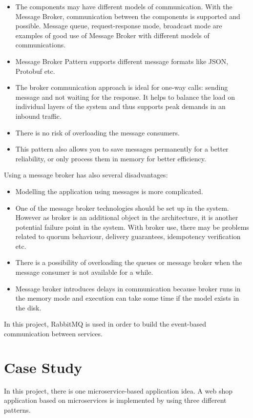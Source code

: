 \documentclass{article}
\begin{document}
\begin{itemize}
    \item The components may have different models of communication. With the Message Broker, communication between the components is supported and possible. Message queue, request-response mode, broadcast mode are examples of good use of Message Broker with different models of communications.
    \item Message Broker Pattern supports different message formats like JSON, Protobuf etc.
    \item The broker communication approach is ideal for one-way calls: sending message and not waiting for the response.  It helps to balance the load on individual layers of the system and thus supports peak demands in an inbound traffic.
    \item There is no risk of overloading the message consumers.
    \item This pattern also allows you to save messages permanently for a better reliability, or only process them in memory for better efficiency.
\end{itemize}

\noindent Using a message broker has also several disadvantages\cite{microserviceEventBased2}:
\begin{itemize}
    \item Modelling the application using messages is more complicated.
    \item One of the message broker technologies should be set up in the system. However as broker is an additional object in the architecture, it is another potential failure point in the system. With broker use, there may be problems related to quorum behaviour, delivery guarantees, idempotency verification etc\cite{microserviceEventBased2}.
    \item There is a possibility of overloading the queues or message broker when the message consumer is not available for a while. 
    \item Message broker introduces delays in communication because broker runs in the memory mode and execution can take some time if the model exists in the disk.      

\end{itemize}

\noindent In this project, RabbitMQ is used in order to build the event-based communication between services.

\section{Case Study}
In this project, there is one microservice-based application idea. A web shop application based on microservices is implemented by using three different patterns. 
\end{document}
